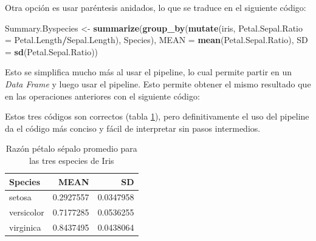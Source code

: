 \documentclass[]{book}
\newenvironment{Shaded}{\begin{snugshade}}{\end{snugshade}}
\newcommand{\DataTypeTok}[1]{\textcolor[rgb]{0.13,0.29,0.53}{#1}}
\newcommand{\KeywordTok}[1]{\textcolor[rgb]{0.13,0.29,0.53}{\textbf{#1}}}
\newcommand{\NormalTok}[1]{#1}
\newcommand{\OperatorTok}[1]{\textcolor[rgb]{0.81,0.36,0.00}{\textbf{#1}}}
\newcommand{\StringTok}[1]{\textcolor[rgb]{0.31,0.60,0.02}{#1}}
\begin{document}
Otra opción es usar paréntesis anidados, lo que se traduce en el
siguiente código:

\begin{Shaded}
\begin{Highlighting}[]
\NormalTok{Summary.Byspecies <-}\StringTok{ }\KeywordTok{summarize}\NormalTok{(}\KeywordTok{group_by}\NormalTok{(}\KeywordTok{mutate}\NormalTok{(iris, }\DataTypeTok{Petal.Sepal.Ratio =}\NormalTok{ Petal.Length}\OperatorTok{/}\NormalTok{Sepal.Length), }
\NormalTok{    Species), }\DataTypeTok{MEAN =} \KeywordTok{mean}\NormalTok{(Petal.Sepal.Ratio), }\DataTypeTok{SD =} \KeywordTok{sd}\NormalTok{(Petal.Sepal.Ratio))}
\end{Highlighting}
\end{Shaded}

Esto se simplifica mucho más al usar el pipeline, lo cual permite partir
en un \emph{Data Frame} y luego usar el pipeline. Esto permite obtener
el mismo resultado que en las operaciones anteriores con el siguiente
código:

\begin{Shaded}
\end{Shaded}

Estos tres códigos son correctos (tabla \ref{tab:Pipe}), pero
definitivamente el uso del pipeline da el código más conciso y fácil de
interpretar sin pasos intermedios.

\begin{table}

\caption{\label{tab:Pipe}Razón pétalo sépalo promedio para las tres especies de Iris}
\centering
\begin{tabular}[t]{lrr}
\toprule
Species & MEAN & SD\\
\midrule
setosa & 0.2927557 & 0.0347958\\
versicolor & 0.7177285 & 0.0536255\\
virginica & 0.8437495 & 0.0438064\\
\bottomrule
\end{tabular}
\end{table}
\end{document}
